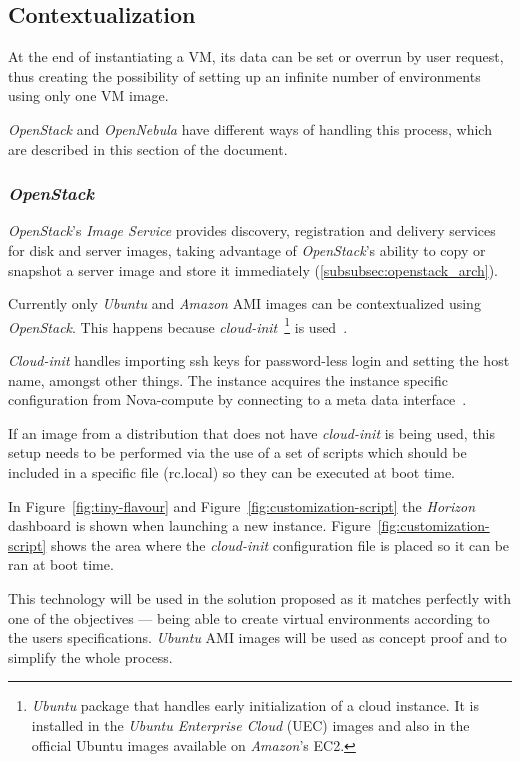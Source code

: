 \subsection{Contextualization}\label{subsec:contextualization}

At the end of instantiating a VM, its data can be set or overrun by user request, thus creating the possibility of setting up an infinite number of environments using only one VM image.

\textit{OpenStack} and \textit{OpenNebula} have different ways of handling this process, which are described in this section of the document.

\subsubsection{\textit{OpenStack}}

\textit{OpenStack}'s \textit{Image Service} provides discovery, registration and delivery services for disk and server images, taking advantage of \textit{OpenStack}'s ability to copy or snapshot a server image and store it immediately (\ref{subsubsec:openstack_arch}).

Currently only \textit{Ubuntu} and \textit{Amazon} AMI images can be contextualized using \textit{OpenStack}. This happens because \textit{cloud-init}~\footnote{\textit{Ubuntu} package that handles early initialization of a cloud instance. It is installed in the \textit{Ubuntu Enterprise Cloud} (UEC) images and also in the official Ubuntu images available on \textit{Amazon}'s EC2.} is used~\cite{essex-cloudinit}.

\textit{Cloud-init} handles importing ssh keys for password-less login and setting the host name, amongst other things. The instance acquires the instance specific configuration from Nova-compute by connecting to a meta data interface~\cite{essex-cloudinit}.

If an image from a distribution that does not have \textit{cloud-init} is being used, this setup needs to be performed via the use of a set of scripts which should be included in a specific file (rc.local) so they can be executed at boot time.

In Figure~\ref{fig:tiny-flavour} and Figure~\ref{fig:customization-script} the \textit{Horizon} dashboard is shown when launching a new instance. Figure~\ref{fig:customization-script} shows the area where the \textit{cloud-init} configuration file is placed so it can be ran at boot time.

This technology will be used in the solution proposed as it matches perfectly with one of the objectives --- being able to create virtual environments according to the users specifications. \textit{Ubuntu} AMI images will be used as concept proof and to simplify the whole process.

